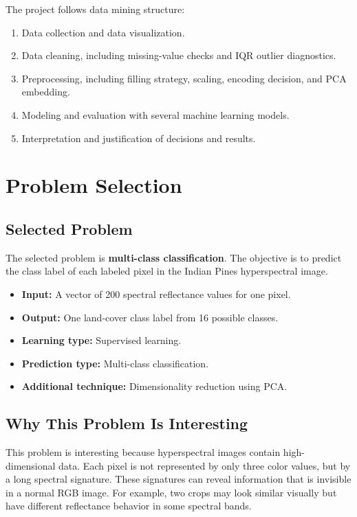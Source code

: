 \documentclass[12pt,a4paper]{article}
\begin{document}
The project follows data mining structure:

\begin{enumerate}
    \item Data collection and data visualization.
    \item Data cleaning, including missing-value checks and IQR outlier diagnostics.
    \item Preprocessing, including filling strategy, scaling, encoding decision, and PCA embedding.
    \item Modeling and evaluation with several machine learning models.
    \item Interpretation and justification of decisions and results.
\end{enumerate}

\section{Problem Selection}

\subsection{Selected Problem}

The selected problem is \textbf{multi-class classification}. The objective is to predict the class label of each labeled pixel in the Indian Pines hyperspectral image.

\begin{itemize}
    \item \textbf{Input:} A vector of 200 spectral reflectance values for one pixel.
    \item \textbf{Output:} One land-cover class label from 16 possible classes.
    \item \textbf{Learning type:} Supervised learning.
    \item \textbf{Prediction type:} Multi-class classification.
    \item \textbf{Additional technique:} Dimensionality reduction using PCA.
\end{itemize}

\subsection{Why This Problem Is Interesting}

This problem is interesting because hyperspectral images contain high-dimensional data. Each pixel is not represented by only three color values, but by a long spectral signature. These signatures can reveal information that is invisible in a normal RGB image. For example, two crops may look similar visually but have different reflectance behavior in some spectral bands.
\end{document}
